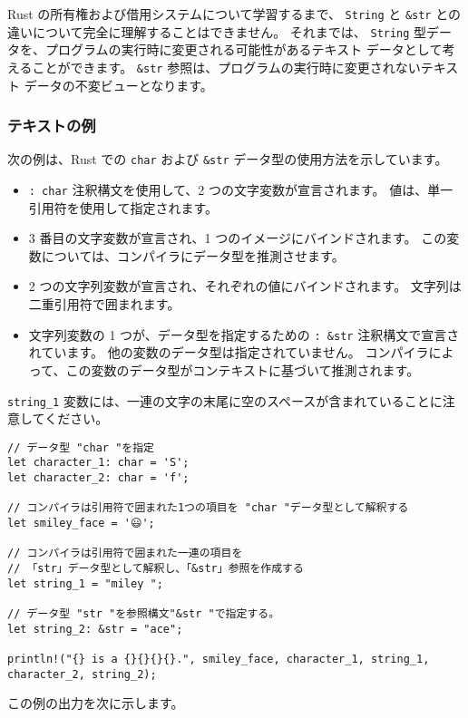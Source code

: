 Rust の所有権および借用システムについて学習するまで、 \texttt{String} と \texttt{&str} との違いについて完全に理解することはできません。 それまでは、 \texttt{String} 型データを、プログラムの実行時に変更される可能性があるテキスト データとして考えることができます。 \texttt{&str} 参照は、プログラムの実行時に変更されないテキスト データの不変ビューとなります。

\subsubsection{テキストの例}

次の例は、Rust での \texttt{char} および \texttt{&str} データ型の使用方法を示しています。

\begin{itemize}
\item \texttt{: char} 注釈構文を使用して、2 つの文字変数が宣言されます。 値は、単一引用符を使用して指定されます。
\item 3 番目の文字変数が宣言され、1 つのイメージにバインドされます。 この変数については、コンパイラにデータ型を推測させます。
\item 2 つの文字列変数が宣言され、それぞれの値にバインドされます。 文字列は二重引用符で囲まれます。
\item 文字列変数の 1 つが、データ型を指定するための \texttt{: &str} 注釈構文で宣言されています。 他の変数のデータ型は指定されていません。 コンパイラによって、この変数のデータ型がコンテキストに基づいて推測されます。
\end{itemize}

\texttt{string_1} 変数には、一連の文字の末尾に空のスペースが含まれていることに注意してください。

\begin{lstlisting}[numbers=none]
// データ型 "char "を指定
let character_1: char = 'S';
let character_2: char = 'f';
   
// コンパイラは引用符で囲まれた1つの項目を "char "データ型として解釈する
let smiley_face = '😃';

// コンパイラは引用符で囲まれた一連の項目を
// 「str」データ型として解釈し、「&str」参照を作成する
let string_1 = "miley ";

// データ型 "str "を参照構文"&str "で指定する。
let string_2: &str = "ace";

println!("{} is a {}{}{}{}.", smiley_face, character_1, string_1, character_2, string_2);
\end{lstlisting}

この例の出力を次に示します。


